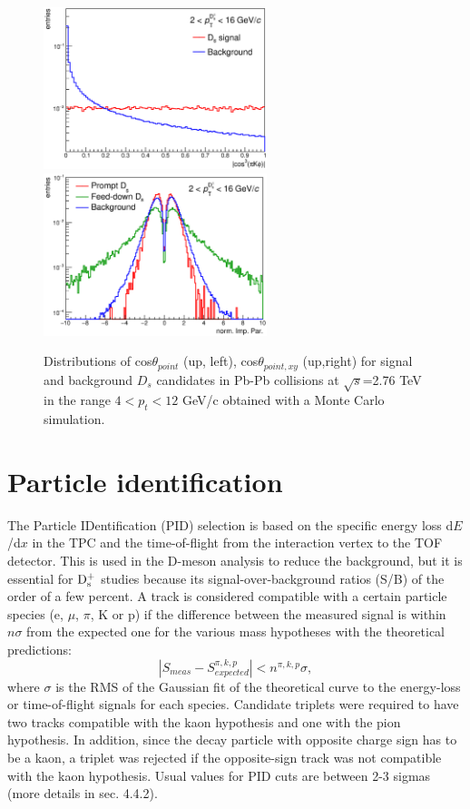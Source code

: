 \begin{figure}[!t]
\includegraphics[width=6.5cm]{FigCap4/CosPiKPhi3.eps}
\includegraphics[width=6.5cm]{FigCap4/normIP.eps}
\caption{Distributions of cos$\theta_{point}$ (up, left), cos$\theta_{point,xy}$ (up,right) for signal and background $D_s$ candidates in Pb-Pb collisions at $\sqrt{s}$=2.76 TeV in the range $4< p_t <12$ GeV/c obtained with a Monte Carlo simulation.}
\label{fig:distrib}
\end{figure}

\section{Particle identification}
The Particle IDentification (PID) selection is based on the specific energy loss 
d$E$/d$x$ in the TPC and the time-of-flight from the interaction vertex to the 
TOF detector. This is used in the D-meson analysis to reduce the background, 
but it is essential for ${\rm D_s^+}$ studies because its signal-over-background
 ratios (S/B) of the order of a few percent.
A track is  considered compatible with a certain particle species 
(e, $\mu$, $\pi$, K or p) if the difference between the measured signal is
 within $n\sigma$ from the expected one for the various mass hypotheses
  with the theoretical predictions:
\[
|S_{meas}-S^{\pi,k,p}_{expected}| < n^{\pi,k,p}\sigma ,
\]
where $\sigma$ is the RMS of the Gaussian fit of the theoretical 
curve to the energy-loss or time-of-flight signals for each species.
Candidate triplets were required to have two tracks compatible with 
the kaon hypothesis and one with the pion hypothesis. In addition, 
since the decay particle with opposite charge sign has to be a kaon, 
a triplet was rejected if the opposite-sign track was not compatible 
with the kaon hypothesis. Usual values for PID cuts are between 
2-3 sigmas (more details in sec. 4.4.2).

